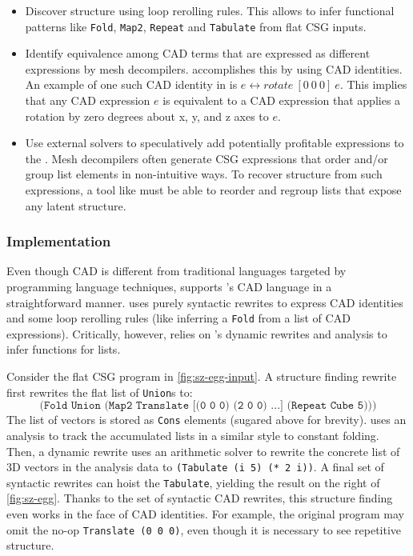 \begin{itemize}

  \item Discover structure using loop rerolling rules.
    This allows \sz to infer functional patterns like
    \texttt{Fold}, \texttt{Map2}, \texttt{Repeat} and
    \texttt{Tabulate} from flat CSG inputs.

  \item Identify equivalence among CAD terms that are
    expressed as different expressions by mesh decompilers.
    \sz accomplishes this by using CAD identities.
    An example of one such CAD identity in \sz is
    $e \leftrightarrow \mathit{rotate}~[0 ~ 0 ~ 0] ~ e$.
    This implies that any CAD expression $e$
    is equivalent to a CAD expression that applies
    a rotation by zero degrees about x, y, and z axes
    to $e$.

  \item Use external solvers to
    speculatively add potentially profitable
    expressions to the \egraph.
    Mesh decompilers often generate CSG expressions
    that order and/or group list elements in
    non-intuitive ways.
    To recover structure from such expressions,
    a tool like \sz must be able to reorder and regroup
    lists that expose any latent structure.

\end{itemize}

\subsubsection{Implementation}

Even though CAD is
  different from traditional languages
  targeted by programming language techniques,
  \egg supports \sz's CAD language in a straightforward manner.
\sz uses purely syntactic rewrites to express
  CAD identities and some loop rerolling rules
  (like inferring a \texttt{Fold} from a list of CAD expressions).
Critically, however, \sz relies on \egg's
  dynamic rewrites and \eclass analysis to infer functions
  for lists.

Consider the flat CSG program in \autoref{fig:sz-egg-input}.
A structure finding rewrite first rewrites the flat list of \texttt{Union}s to:
$$\texttt{(Fold Union (Map2 Translate [(0 0 0) (2 0 0) ...] (Repeat Cube 5)))}$$
The list of vectors is stored as \texttt{Cons} elements (sugared above for brevity).
\sz uses an \eclass analysis to track the accumulated lists in a similar style
  to constant folding.
Then, a dynamic rewrite uses an arithmetic solver to rewrite the concrete
  list of 3D vectors in the analysis data
  to \mbox{\texttt{(Tabulate (i 5) (* 2 i))}}.
A final set of syntactic rewrites can hoist the \texttt{Tabulate}, yielding the
  result on the right of \autoref{fig:sz-egg}.
Thanks to the set of syntactic CAD rewrites, this structure finding even works
  in the face of CAD identities.
For example, the original program may omit the no-op
  \texttt{Translate (0 0 0)}, even though it is necessary to see repetitive
  structure.

